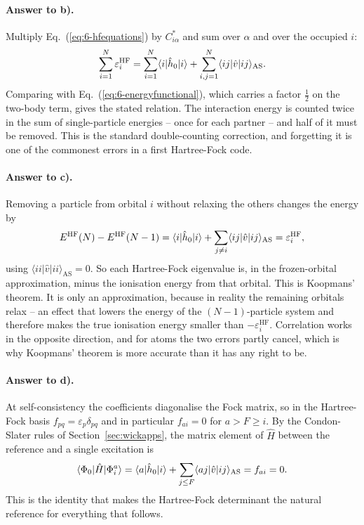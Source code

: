 \paragraph{Answer to b).}
Multiply Eq.~(\ref{eq:6-hfequations}) by $C^{*}_{i\alpha}$ and sum over
$\alpha$ and over the occupied $i$:
\begin{equation}
  \sum_{i=1}^{N}\varepsilon_i^{\mathrm{HF}}
  = \sum_{i=1}^{N}\langle i | \hat{h}_0 | i \rangle
  + \sum_{i,j=1}^{N}\langle ij\vert\hat{v}\vert ij\rangle_{\mathrm{AS}} .
  \label{eq:6-exb2}
\end{equation}
Comparing with Eq.~(\ref{eq:6-energyfunctional}), which carries a factor
$\tfrac12$ on the two-body term, gives the stated relation.  The interaction
energy is counted twice in the sum of single-particle energies -- once for
each partner -- and half of it must be removed.  This is the standard
double-counting correction, and forgetting it is one of the commonest errors
in a first Hartree-Fock code.

\paragraph{Answer to c).}
Removing a particle from orbital $i$ without relaxing the others changes the
energy by
\begin{equation}
  E^{\mathrm{HF}}(N) - E^{\mathrm{HF}}(N-1)
  = \langle i | \hat{h}_0 | i \rangle
    + \sum_{j\ne i}\langle ij\vert\hat{v}\vert ij\rangle_{\mathrm{AS}}
  = \varepsilon_i^{\mathrm{HF}},
  \label{eq:6-exc2}
\end{equation}
using $\langle ii\vert\hat{v}\vert ii\rangle_{\mathrm{AS}}=0$.  So each
Hartree-Fock eigenvalue is, in the frozen-orbital approximation, minus the
ionisation energy from that orbital.  This is Koopmans' theorem.  It is only
an approximation, because in reality the remaining orbitals relax -- an effect
that lowers the energy of the $(N-1)$-particle system and therefore makes the
true ionisation energy smaller than $-\varepsilon_i^{\mathrm{HF}}$.
Correlation works in the opposite direction, and for atoms the two errors
partly cancel, which is why Koopmans' theorem is more accurate than it has any
right to be.

\paragraph{Answer to d).}
At self-consistency the coefficients diagonalise the Fock matrix, so in the
Hartree-Fock basis $f_{pq}=\varepsilon_p\delta_{pq}$ and in particular
$f_{ai}=0$ for $a>F\ge i$.  By the Condon-Slater rules of
Section~\ref{sec:wickapps}, the matrix element of $\hat{H}$ between the
reference and a single excitation is
\begin{equation}
  \langle \Phi_0 | \hat{H} | \Phi_i^a \rangle
  = \langle a | \hat{h}_0 | i \rangle
    + \sum_{j\le F}\langle aj\vert\hat{v}\vert ij\rangle_{\mathrm{AS}}
  = f_{ai} = 0 .
  \label{eq:6-exd2}
\end{equation}
This is the identity that makes the Hartree-Fock determinant the natural
reference for everything that follows.

